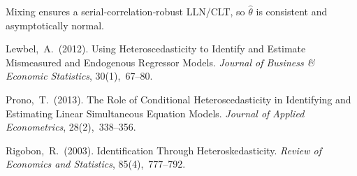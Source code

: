 \documentclass{article}
\theoremstyle{plain}
\begin{document}
Mixing ensures a serial‑correlation‑robust LLN/CLT, so
$\hat\theta$ is consistent and asymptotically normal.

\bigskip
\begin{thebibliography}{9}\setlength{\itemsep}{0pt}

Lewbel, A.\ (2012).
\newblock Using Heteroscedasticity to Identify and Estimate Mismeasured and
  Endogenous Regressor Models.
\newblock \emph{Journal of Business \& Economic Statistics}, 30(1), 67–80.

Prono, T.\ (2013).
\newblock The Role of Conditional Heteroscedasticity in Identifying and
  Estimating Linear Simultaneous Equation Models.
\newblock \emph{Journal of Applied Econometrics}, 28(2), 338–356.

Rigobon, R.\ (2003).
\newblock Identification Through Heteroskedasticity.
\newblock \emph{Review of Economics and Statistics}, 85(4), 777–792.

\end{thebibliography}
\end{document}

